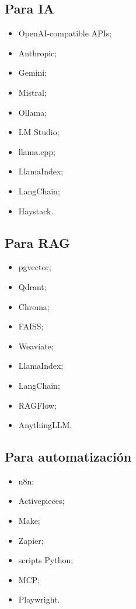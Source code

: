 \subsection{Para IA}\label{para-ia}

\begin{itemize}
\tightlist
\item
  OpenAI-compatible APIs;
\item
  Anthropic;
\item
  Gemini;
\item
  Mistral;
\item
  Ollama;
\item
  LM Studio;
\item
  llama.cpp;
\item
  LlamaIndex;
\item
  LangChain;
\item
  Haystack.
\end{itemize}

\subsection{Para RAG}\label{para-rag}

\begin{itemize}
\tightlist
\item
  pgvector;
\item
  Qdrant;
\item
  Chroma;
\item
  FAISS;
\item
  Weaviate;
\item
  LlamaIndex;
\item
  LangChain;
\item
  RAGFlow;
\item
  AnythingLLM.
\end{itemize}

\subsection{Para automatización}\label{para-automatizaciuxf3n}

\begin{itemize}
\tightlist
\item
  n8n;
\item
  Activepieces;
\item
  Make;
\item
  Zapier;
\item
  scripts Python;
\item
  MCP;
\item
  Playwright.
\end{itemize}

